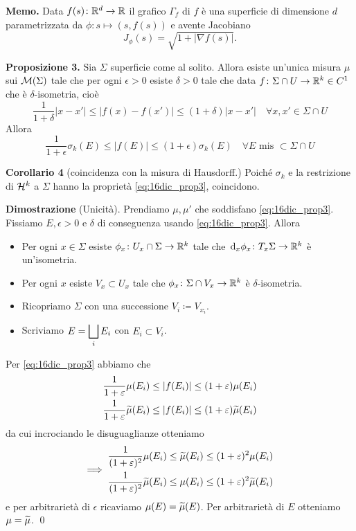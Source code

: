 \textbf{Memo.} Data $f(s) \colon \mathbb R^d \to \mathbb R$ il grafico $\Gamma_f$ di $f$ è una superficie di dimensione $d$ parametrizzata da $\phi \colon s \mapsto (s,f(s))$ e avente Jacobiano
$$
	J_\phi(s) = \sqrt{1 + |\nabla f(s)|}.
$$

\vss

\textbf{Proposizione 3.} Sia $\Sigma$ superficie come al solito. Allora esiste un'unica misura $\mu$ sui $\mathcal{M}(\Sigma)$ tale che per ogni $\epsilon > 0$ esiste $\delta > 0$ tale che data $f \colon \Sigma \cap U \to \mathbb R^k \in C^1$ che è $\delta$-isometria, cioè
%
$$
	\frac{1}{1 + \delta} |x-x'| \leq |f(x) - f(x')| \leq (1+\delta)|x-x'| \quad \forall x,x' \in \Sigma \cap U
$$
Allora
%
\begin{equation}
	\label{eq:16dic_prop3} \tag{P}
	\frac{1}{1+\epsilon} \sigma_k(E) \leq |f(E)| \leq (1+\epsilon)\sigma_k(E) \quad \forall E \text{ mis } \subset \Sigma \cap U
\end{equation}
%

\textbf{Corollario 4} (coincidenza con la misura di Hausdorff.) Poiché $\sigma_k$ e la restrizione di $\mathcal{H}^k$ a $\Sigma$ hanno la proprietà \eqref{eq:16dic_prop3}, coincidono.

\textbf{Dimostrazione} (Unicità). 
Prendiamo $\mu,\mu'$ che soddisfano \eqref{eq:16dic_prop3}.
Fissiamo $E,\epsilon > 0$ e $\delta$ di conseguenza usando \eqref{eq:16dic_prop3}. Allora
\begin{itemize}

	\item Per ogni $x \in \Sigma$ esiste $\phi_x \colon U_x \cap \Sigma \to \mathbb R^k$ tale che $\,\mathrm{d}_x \phi_x \colon T_x \Sigma \to \mathbb R^k$ è un'isometria.


	\item Per ogni $x$ esiste $V_x \subset U_x$ tale che $\phi_x \colon \Sigma \cap V_x \to \mathbb R^k$ è $\delta$-isometria.


	\item Ricopriamo $\Sigma$ con una successione $V_i \coloneqq V_{x_i}$.


	\item Scriviamo $\displaystyle E = \bigsqcup_i E_i$ con $E_i \subset V_i$.

\end{itemize}
 
Per \eqref{eq:16dic_prop3} abbiamo che
%
\begin{gather*}
	\frac{1}{1+\varepsilon} \mu(E_i) \leq |f(E_i)| \leq (1+\varepsilon) \mu(E_i) \\
	\frac{1}{1+\varepsilon} \widetilde{\mu}(E_i) \leq |f(E_i)| \leq (1+\varepsilon) \widetilde{\mu}(E_i)
\end{gather*}
da cui incrociando le disuguaglianze otteniamo
$$
\Longrightarrow \;
\begin{gathered}
	\frac{1}{(1+\varepsilon)^2} \mu(E_i) \leq \widetilde \mu(E_i) \leq (1+\varepsilon)^2 \mu(E_i) \\
	\frac{1}{(1+\varepsilon)^2} \widetilde \mu(E_i) \leq \mu(E_i) \leq (1+\varepsilon)^2 \widetilde \mu(E_i)
\end{gathered}
$$
e per arbitrarietà di $\epsilon$ ricaviamo $\mu(E) = \widetilde{\mu}(E)$. Per arbitrarietà di $E$ otteniamo $\mu = \widetilde{\mu}$.
\qed


